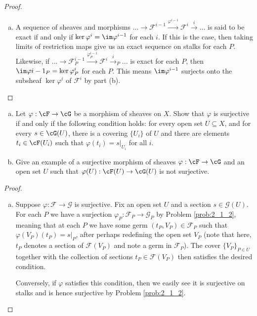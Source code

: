 \begin{problemset}
\begin{proof}
\begin{enumerate}[(a)]
		\item A sequence of sheaves and morphisms $...\to \mathcal F^{i-1}\xrightarrow{\varphi^{i-1}} \mathcal F^i\xrightarrow{i} ...$ is said to be exact if and only if $\ker\varphi^{i} = \im\varphi^{i-1}$ for each $i$. If this is the case, then taking limits of restriction maps give us an exact sequence on stalks for each $P$. Likewise, if $...\to \mathcal F^{i-1}_P\xrightarrow{\varphi^{i-1}_P} \mathcal F^i\xrightarrow{i}_P ...$ is exact for each $P$, then $\im\varphi{i-1}_P = \ker\varphi^{i}_P$ for each $P$. This means $\im\varphi^{i-1}$ surjects onto the subsheaf $\ker\varphi^i$ of $\mathcal F^i$ by part (b). 
	  \end{enumerate}
	\end{proof}
	\item
	\begin{enumerate}[(a)]
		\item  Let $\varphi:\cF\to \cG$ be a morphism of sheaves on $X$. Show that $\varphi$ is surjective if and only if the following condition holds: for every open set $U\subseteq X$, and for every $s \in \cG(U)$, there is a covering $\{U_i\}$ of $U$ and there are elements $t_i \in \cF(U_i)$ such that $\varphi(t_i) = s|_{U_i}$ for all $i$.
		\item Give an example of a surjective morphism of sheaves $\varphi:\cF\to \cG$ and an open set $U$ such that $\varphi(U):\cF(U)\to \cG(U)$ is not surjective.
	\end{enumerate}
	\begin{proof}$ $
		\begin{enumerate}[(a)]
			\item Suppose $\varphi:\mathcal F\to \mathcal G$ is surjective. Fix an open set $U$ and a section $s\in \mathcal G(U)$. For each $P$ we have a surjection $\varphi_P:\mathcal F_P \to \mathcal G_P$ by Problem \ref{prob:2_1_2}, meaning that at each $P$ we have some germ $(t_P,V_P) \in \mathcal F_P$ such that $\varphi(V_P)(t_P) = s|_P$, after perhaps redefining the open set $V_P$ (note that here, $t_P$ denotes a section of $\mathcal F(V_P)$ and note a germ in $\mathcal F_P$). The cover $\{V_P\}_{P\in U}$ together with the collection of sections $t_P \in \mathcal F(V_P)$ then satisfies the desired condition.

			Conversely, if $\varphi$ satisfies this condition, then we easily see it is surjective on stalks and is hence surjective by Problem \ref{prob:2_1_2}.


\end{enumerate}
\end{proof}
\end{problemset}
